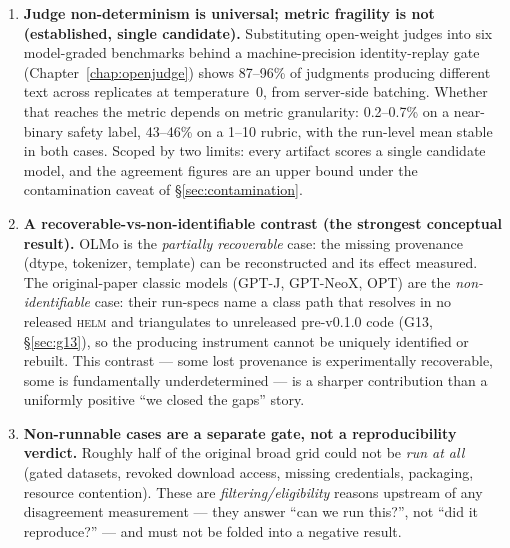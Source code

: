 \documentclass[11pt]{report}
\newcommand{\code}[1]{\texttt{#1}}
\begin{document}
\begin{enumerate}
        published number, with decode semantics explicitly excluded as the cause. A
        corollary worth stating separately: the \emph{same} run spec
        (\code{temperature=0.0}) means true greedy on one engine and
        near-zero-temperature sampling on another, so a nominally identical recipe
        does not fix the decode procedure.
  \item \textbf{Judge non-determinism is universal; metric fragility is not
        (established, single candidate).} Substituting open-weight judges into six
        model-graded benchmarks behind a machine-precision identity-replay gate
        (Chapter~\ref{chap:openjudge}) shows 87--96\% of judgments producing
        different text across replicates at temperature~0, from server-side batching.
        Whether that reaches the metric depends on metric granularity: 0.2--0.7\% on
        a near-binary safety label, 43--46\% on a 1--10 rubric, with the run-level
        mean stable in both cases. Scoped by two limits: every artifact scores a
        single candidate model, and the agreement figures are an upper bound under
        the contamination caveat of \S\ref{sec:contamination}.
  \item \textbf{A recoverable-vs-non-identifiable contrast (the strongest conceptual
        result).} OLMo is the \emph{partially recoverable} case: the missing provenance (dtype,
        tokenizer, template) can be reconstructed and its effect measured. The
        original-paper classic models (GPT-J, GPT-NeoX, OPT) are the
        \emph{non-identifiable} case: their run-specs name a class path that resolves
        in no released \textsc{helm} and triangulates to unreleased pre-v0.1.0 code
        (G13, \S\ref{sec:g13}), so the producing instrument cannot be uniquely
        identified or rebuilt. This contrast --- some lost provenance is
        experimentally recoverable, some is fundamentally underdetermined --- is a
        sharper contribution than a uniformly positive ``we closed the gaps'' story.
  \item \textbf{Non-runnable cases are a separate gate, not a reproducibility
        verdict.} Roughly half of the original broad grid could not be \emph{run at
        all} (gated datasets, revoked download access, missing credentials, packaging,
        resource contention). These are \emph{filtering/eligibility} reasons upstream
        of any disagreement measurement --- they answer ``can we run this?'', not
        ``did it reproduce?'' --- and must not be folded into a negative result.
\end{enumerate}
\end{document}
